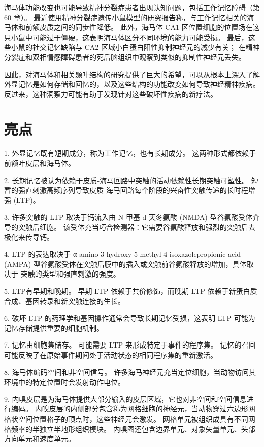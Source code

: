 海马体功能改变也可能导致精神分裂症患者出现认知问题，包括工作记忆障碍（第 60 章）。 最近使用精神分裂症遗传小鼠模型的研究报告称，与工作记忆相关的海马体和前额皮质之间的同步性降低。 此外，海马体 CA1 区位置细胞的位置场在这只小鼠中可能过于僵硬，这表明海马体区分不同环境的能力可能受损。 最后，这些小鼠的社交记忆缺陷与 CA2 区域小白蛋白阳性抑制神经元的减少有关； 在精神分裂症和双相情感障碍患者的死后脑组织中观察到类似的抑制性神经元丢失。

因此，对海马体和相关颞叶结构的研究提供了巨大的希望，可以从根本上深入了解外显记忆是如何存储和回忆的，以及这些结构的功能改变如何导致神经精神疾病。 反过来，这种洞察力可能有助于发现针对这些破坏性疾病的新疗法。

\section{亮点}

1. 外显记忆既有短期成分，称为工作记忆，也有长期成分。 这两种形式都依赖于前额叶皮层和海马体。 

2. 长期记忆被认为依赖于皮质-海马回路中突触的活动依赖性长期突触可塑性。 短暂的强直刺激高频序列导致皮质-海马回路每个阶段的兴奋性突触传递的长时程增强 (LTP)。 

3. 许多突触的 LTP 取决于钙流入由 N-甲基-d-天冬氨酸 (NMDA) 型谷氨酸受体介导的突触后细胞。 该受体充当巧合检测器：它需要谷氨酸释放和强烈的突触后去极化来传导钙。 

4. LTP 的表达取决于 α-amino-3-hydroxy-5-methyl-4-isoxazolepropionic acid (AMPA) 型谷氨酸受体在突触后膜中的插入或突触前谷氨酸释放的增加，具体取决于 突触的类型和强直刺激的强度。 

5. LTP有早期和晚期。 早期 LTP 依赖于共价修饰，而晚期 LTP 依赖于新蛋白质合成、基因转录和新突触连接的生长。 

6. 破坏 LTP 的药理学和基因操作通常会导致长期记忆受损，这表明 LTP 可能为记忆存储提供重要的细胞机制。 

7. 记忆由细胞集储存。 可能需要 LTP 来形成特定于事件的程序集。 记忆的召回可能反映了在原始事件期间处于活动状态的相同程序集的重新激活。 

8. 海马体编码空间和非空间信号。 许多海马神经元充当定位细胞，当动物访问其环境中的特定位置时会发射动作电位。 

9. 内嗅皮层是为海马体提供大部分输入的皮层区域，它也对非空间和空间信息进行编码。 内嗅皮层的内侧部分包含称为网格细胞的神经元，当动物穿过六边形网格状空间位置格子的顶点时，这些神经元会激发。 网格单元被组织成具有不同网格频率的半独立半地形组织模块。 内嗅图还包含边界单元、对象矢量单元、头部方向单元和速度单元。 

